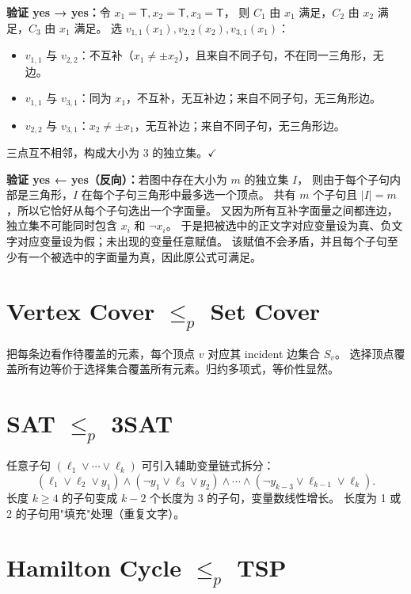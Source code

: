 \documentclass[UTF8,openany,12pt]{ctexbook}
\theoremstyle{remark}
\begin{document}
\textbf{验证 yes → yes：}令 $x_1=\mathsf{T}, x_2=\mathsf{T}, x_3=\mathsf{T}$，
则 $C_1$ 由 $x_1$ 满足，$C_2$ 由 $x_2$ 满足，$C_3$ 由 $x_1$ 满足。
选 $v_{1,1}(x_1), v_{2,2}(x_2), v_{3,1}(x_1)$：
\begin{itemize}
  \item $v_{1,1}$ 与 $v_{2,2}$：不互补（$x_1 \ne \pm x_2$），且来自不同子句，不在同一三角形，无边。
  \item $v_{1,1}$ 与 $v_{3,1}$：同为 $x_1$，不互补，无互补边；来自不同子句，无三角形边。
  \item $v_{2,2}$ 与 $v_{3,1}$：$x_2 \ne \pm x_1$，无互补边；来自不同子句，无三角形边。
\end{itemize}
三点互不相邻，构成大小为 3 的独立集。$\checkmark$

\textbf{验证 yes ← yes（反向）：}若图中存在大小为 $m$ 的独立集 $I$，
则由于每个子句内部是三角形，$I$ 在每个子句三角形中最多选一个顶点。
共有 $m$ 个子句且 $|I|=m$，所以它恰好从每个子句选出一个字面量。
又因为所有互补字面量之间都连边，独立集不可能同时包含 $x_i$ 和 $\neg x_i$。
于是把被选中的正文字对应变量设为真、负文字对应变量设为假；未出现的变量任意赋值。
该赋值不会矛盾，并且每个子句至少有一个被选中的字面量为真，因此原公式可满足。

\section[Vertex Cover 归约到 Set Cover]{Vertex Cover $\le_p$ Set Cover}

把每条边看作待覆盖的元素，每个顶点 $v$ 对应其 incident 边集合 $S_v$。
选择顶点覆盖所有边等价于选择集合覆盖所有元素。归约多项式，等价性显然。

\section[SAT 归约到 3SAT]{SAT $\le_p$ 3SAT}

任意子句 $(\ell_1 \vee \cdots \vee \ell_k)$ 可引入辅助变量链式拆分：
\[
  (\ell_1 \vee \ell_2 \vee y_1) \wedge (\neg y_1 \vee \ell_3 \vee y_2)
  \wedge \cdots \wedge (\neg y_{k-3} \vee \ell_{k-1} \vee \ell_k).
\]
长度 $k \ge 4$ 的子句变成 $k-2$ 个长度为 3 的子句，变量数线性增长。
长度为 1 或 2 的子句用"填充"处理（重复文字）。

\section[Hamilton Cycle 归约到 TSP]{Hamilton Cycle $\le_p$ TSP}
\end{document}
